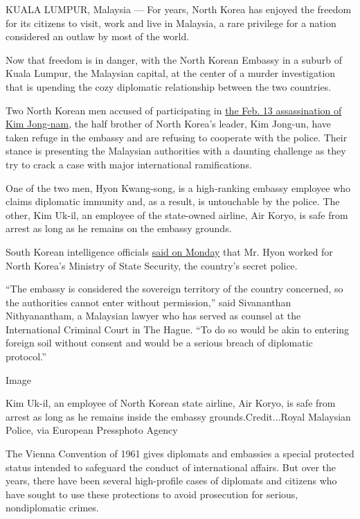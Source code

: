 KUALA LUMPUR, Malaysia --- For years, North Korea has enjoyed the
freedom for its citizens to visit, work and live in Malaysia, a rare
privilege for a nation considered an outlaw by most of the world.

Now that freedom is in danger, with the North Korean Embassy in a suburb
of Kuala Lumpur, the Malaysian capital, at the center of a murder
investigation that is upending the cozy diplomatic relationship between
the two countries.

Two North Korean men accused of participating in
\href{https://www.nytimes3xbfgragh.onion/2017/02/22/world/asia/kim-jong-nam-assassination-korea-malaysia.html}{the
Feb. 13 assassination of Kim Jong-nam}, the half brother of North
Korea's leader, Kim Jong-un, have taken refuge in the embassy and are
refusing to cooperate with the police. Their stance is presenting the
Malaysian authorities with a daunting challenge as they try to crack a
case with major international ramifications.

One of the two men, Hyon Kwang-song, is a high-ranking embassy employee
who claims diplomatic immunity and, as a result, is untouchable by the
police. The other, Kim Uk-il, an employee of the state-owned airline,
Air Koryo, is safe from arrest as long as he remains on the embassy
grounds.

South Korean intelligence officials
\href{https://www.nytimes3xbfgragh.onion/2017/02/27/world/asia/north-korea-kim-jong-nam-state-security.html}{said
on Monday} that Mr. Hyon worked for North Korea's Ministry of State
Security, the country's secret police.

``The embassy is considered the sovereign territory of the country
concerned, so the authorities cannot enter without permission,'' said
Sivananthan Nithyanantham, a Malaysian lawyer who has served as counsel
at the International Criminal Court in The Hague. ``To do so would be
akin to entering foreign soil without consent and would be a serious
breach of diplomatic protocol.''

Image

Kim Uk-il, an employee of North Korean state airline, Air Koryo, is safe
from arrest as long as he remains inside the embassy
grounds.Credit...Royal Malaysian Police, via European Pressphoto Agency

The Vienna Convention of 1961 gives diplomats and embassies a special
protected status intended to safeguard the conduct of international
affairs. But over the years, there have been several high-profile cases
of diplomats and citizens who have sought to use these protections to
avoid prosecution for serious, nondiplomatic crimes.

